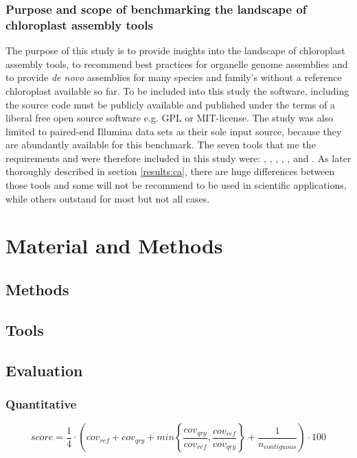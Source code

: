 \subsubsection{Purpose and scope of benchmarking the landscape of chloroplast assembly tools}

The purpose of this study is to provide insights into the landscape of chloroplast assembly tools, to recommend best practices for organelle genome assemblies and to provide \textit{de novo} assemblies for many species and family's without a reference chloroplast available so far.
To be included into this study the software, including the source code must be publicly available and published under the terms of a liberal free open source software e.g. GPL or MIT-license. The study was also limited to paired-end Illumina data sets as their sole input source, because they are abundantly available for this benchmark.  The seven tools that me the requirements and were therefore included in this study were: \ce,  \oa,  \fp,  \ioga,  \np,  \go and  \cassp. As later thoroughly described in section \ref{results:ca}, there are huge differences between those tools and some will not be recommend to be used in scientific applications, while others outstand for most but not all cases.


\section{Material and Methods}
\subsection{Methods}
\subsection{Tools}
\subsection{Evaluation}
\subsubsection{Quantitative}
\begin{equation}
  score = \frac{1}{4} \cdot \left( cov_{ref} +  cov_{qry} + min\left\{ \frac{cov_{qry}}{cov_{ref}}, \frac{cov_{ref}}{cov_{qry}}\right\} + \frac{1}{n_{contiguous} }\right) \cdot 100 
\label{eqn:score_ass}
\end{equation}

